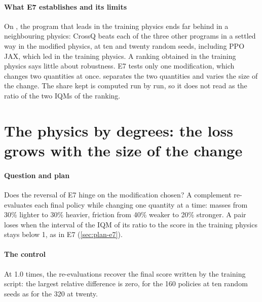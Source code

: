 \paragraph{What E7 establishes and its limits}
On , the program that leads in the training physics ends far behind in a neighbouring physics:
CrossQ beats each of the three other programs in a settled way in the modified physics, at ten and twenty
random seeds, including PPO JAX, which led in the training physics. A ranking obtained in the training physics
says little about robustness. E7 tests only one modification, which changes two quantities at once.
 separates the two quantities and varies the size of the change. The share kept is computed run by
run, so it does not read as the ratio of the two IQMs of the ranking.

\section{The physics by degrees: the loss grows with the size of the change}\label{sec:dose}

\paragraph{Question and plan}
Does the reversal of E7 hinge on the modification chosen? A complement re-evaluates each final policy while changing one quantity at a time: masses from 30\% lighter to 30\% heavier, friction from
40\% weaker to 20\% stronger. A pair loses when the interval of the IQM of its ratio to the score in the training
physics stays below 1, as in E7 (\cref{sec:plan-e7}).

\paragraph{The control}
At 1.0 times, the re-evaluations recover the final score written by the training script: the largest relative difference
is zero, for the 160 policies at ten random seeds as for the 320 at twenty.

